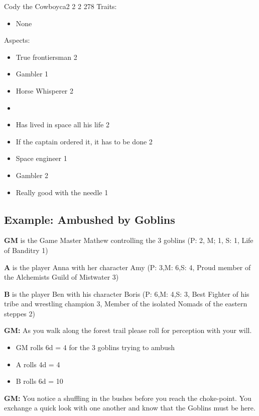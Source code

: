 \documentclass[11pt]{article}
\begin{document}
{\begin{npc}{Cody the Cowboy}{ca}{2 2 2 2}{78}
Traits:
\begin{itemize}
\item None
\end{itemize}

\columnbreak

Aspects:
\begin{itemize}
\item True frontiersman 2
\item Gambler 1
\item Horse Whisperer 2
\item 

\item Has lived in space all his life 2
\item If the captain ordered it, it has to be done 2
\item Space engineer 1
\item Gambler 2
\item Really good with the needle 1
\end{itemize}
\end{npc}


\subsection{Example: Ambushed by Goblins}
\label{sec:orgf3673cb}

\textbf{GM} is the Game Master Mathew controlling the 3 goblins (P: 2, M; 1, S: 1, Life of Banditry 1)

\textbf{A} is the player Anna with her character Amy (P: 3,M: 6,S: 4, Proud member of the Alchemists Guild of Mistwater 3)

\textbf{B} is the player Ben with his character Boris (P: 6,M: 4,S: 3, Best Fighter of his tribe and wrestling champion 3, Member of the isolated Nomads of the eastern steppes 2)

\textbf{GM:} As you walk along the forest trail please roll for perception with your will.
\begin{itemize}
\item GM rolls 6d = 4 for the 3 goblins trying to ambush
\item A rolls 4d =  4
\item B rolls 6d = 10
\end{itemize}

\textbf{GM:} You notice a shuffling in the bushes before you reach the choke-point. You exchange a quick look with one another and know that the Goblins must be here. 

}
\end{document}

